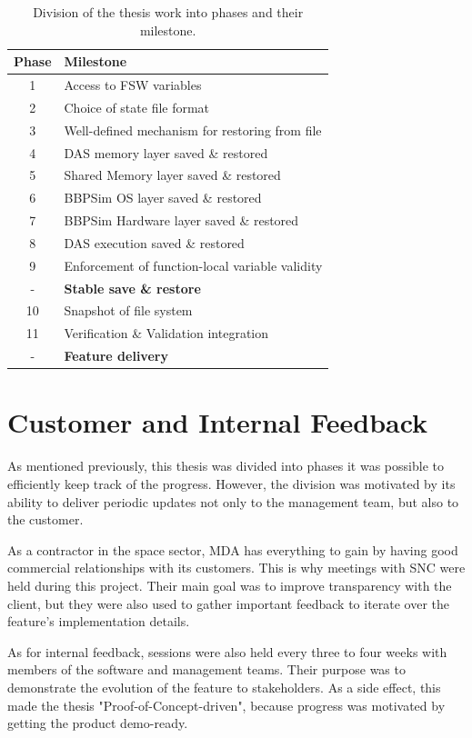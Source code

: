 {\begin{table}[htbp]
	\centering
	\begin{tabularx}{\linewidth}{c X}
	\toprule
	\textbf{Phase} & \textbf{Milestone}\\
	\midrule
	1 & {Access to \gls{FSW} variables}\\
	2 & {Choice of state file format}\\
	3 & {Well-defined mechanism for restoring from file}\\
	4 & {\gls{DAS} memory layer saved \& restored}\\	
	5 & {Shared Memory layer saved \& restored}\\
	6 & {\gls{BBPSim} OS layer saved \& restored}\\
	7 & {\gls{BBPSim} Hardware layer saved \& restored}\\
	8 & {\gls{DAS} execution saved \& restored}\\
	9 & {Enforcement of function-local variable validity}\\
	\cmidrule{2-2} -  & \textbf{Stable save \& restore}\\
	\cmidrule{2-2} 10 & {Snapshot of file system}\\
	11 & {Verification \& Validation integration}\\
	\cmidrule{2-2} - & \textbf{Feature delivery}\\
	\bottomrule
	\end{tabularx}
	\caption{Division of the thesis work into phases and their milestone.}
	\label{tbl:project-phases}
\end{table}

\section{Customer and Internal Feedback}\label{sec:feedback}
As mentioned previously, this thesis was divided into phases it was possible to efficiently keep track of the progress. However, the division was motivated by its ability to deliver periodic updates not only to the management team, but also to the customer.

As a contractor in the space sector, \gls{MDA} has everything to gain by having good commercial relationships with its customers. This is why meetings with \gls{SNC} were held during this project. Their main goal was to improve transparency with the client, but they were also used to gather important feedback to iterate over the feature's implementation details. 

As for internal feedback, sessions were also held every three to four weeks with members of the software and management teams. Their purpose was to demonstrate the evolution of the feature to stakeholders. As a side effect, this made the thesis "Proof-of-Concept-driven", because progress was motivated by getting the product demo-ready.
}